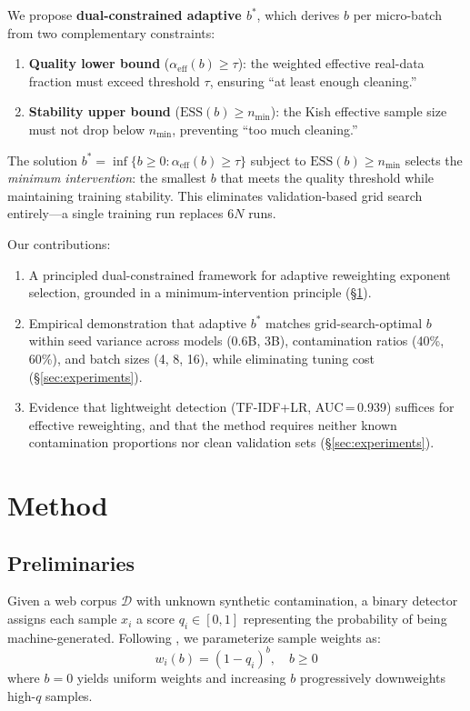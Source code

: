 \documentclass[11pt,a4paper]{article}
\newcommand{\bstar}{b^{*}}
\newcommand{\aeff}{\alpha_{\mathrm{eff}}}
\newcommand{\nmin}{n_{\min}}
\begin{document}
We propose \textbf{dual-constrained adaptive $\bstar$}, which derives $b$ per micro-batch from two complementary constraints:
\begin{enumerate}
\item \textbf{Quality lower bound} ($\aeff(b)\geq\tau$): the weighted effective real-data fraction must exceed threshold $\tau$, ensuring ``at least enough cleaning.''
\item \textbf{Stability upper bound} ($\mathrm{ESS}(b)\geq\nmin$): the Kish effective sample size must not drop below $\nmin$, preventing ``too much cleaning.''
\end{enumerate}
The solution $\bstar=\inf\{b\geq0:\aeff(b)\geq\tau\}$ subject to $\mathrm{ESS}(b)\geq\nmin$ selects the \emph{minimum intervention}: the smallest $b$ that meets the quality threshold while maintaining training stability.
This eliminates validation-based grid search entirely---a single training run replaces $6N$ runs.

Our contributions:
\begin{enumerate}
\item A principled dual-constrained framework for adaptive reweighting exponent selection, grounded in a minimum-intervention principle (\S\ref{sec:method}).
\item Empirical demonstration that adaptive $\bstar$ matches grid-search-optimal $b$ within seed variance across models (0.6B, 3B), contamination ratios (40\%, 60\%), and batch sizes (4, 8, 16), while eliminating tuning cost (\S\ref{sec:experiments}).
\item Evidence that lightweight detection (TF-IDF+LR, AUC\,=\,0.939) suffices for effective reweighting, and that the method requires neither known contamination proportions nor clean validation sets (\S\ref{sec:experiments}).
\end{enumerate}

\section{Method}
\label{sec:method}

\subsection{Preliminaries}
\label{sec:prelim}

Given a web corpus $\mathcal{D}$ with unknown synthetic contamination, a binary detector assigns each sample $x_i$ a score $q_i\in[0,1]$ representing the probability of being machine-generated.
Following \citet{drayson-emnlp2025}, we parameterize sample weights as:
\begin{equation}
w_i(b) = (1 - q_i)^b, \quad b \geq 0
\label{eq:weight}
\end{equation}
where $b=0$ yields uniform weights and increasing $b$ progressively downweights high-$q$ samples.
\end{document}
